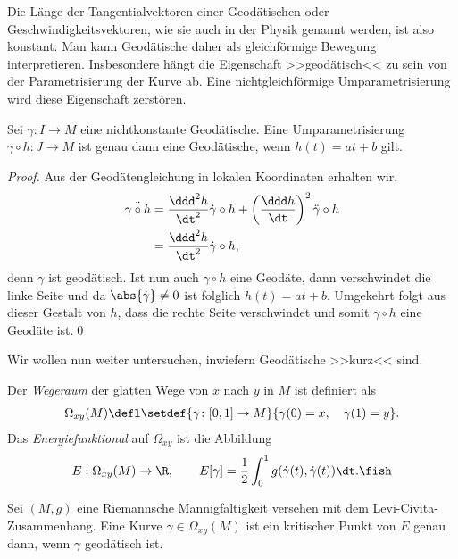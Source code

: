 \documentclass[%
	paper=a5,%
	fleqn,%
	DIV=18,%
	BCOR=0mm,
	fontsize=11pt,
	titlepage=false,%
	bibliography=totoc,
	DIV=18,%
	twoside=true,
	pdftitle=Riemannsche Geometrie,
	pdfauthor=Uwe Semmelmann,
	numbers=noendperiod]%
	{scrbook}
\begin{document}
Die Länge der Tangentialvektoren einer Geodätischen oder Geschwindigkeitsvektoren, wie sie auch in
der Physik genannt werden,  ist also konstant. Man kann Geodätische
daher als gleichförmige Bewegung interpretieren. Insbesondere hängt die
Eigenschaft >>geodätisch<< zu sein von der Parametrisierung der Kurve ab. Eine
nichtgleichförmige Umparametrisierung wird diese Eigenschaft zerstören.

\begin{lem}
Sei $\gamma\colon I\to M$ eine nichtkonstante Geodätische. Eine Umparametrisierung $\gamma\circ h \colon J\to M$ ist genau dann eine Geodätische, wenn $h(t) = at + b$ gilt.\fish
\end{lem}
\begin{proof}
Aus der Geodätengleichung in lokalen Koordinaten erhalten wir,
\begin{align*}
\ddot{\gamma\circ h} &= \frac{\ddd^2 h}{\dt^2} \dot{\gamma}\circ h + 
\left( \frac{\ddd h}{\dt}\right)^2 \ddot{\gamma}\circ h\\
&=\frac{\ddd^2 h}{\dt^2} \dot{\gamma}\circ h,
\end{align*}
denn $\gamma$ ist geodätisch. Ist nun auch $\gamma\circ h$ eine Geodäte, dann verschwindet die linke Seite und da $\abs{\dot\gamma}\neq 0$ ist folglich $h(t) = at+b$. Umgekehrt folgt aus dieser Gestalt von $h$, dass die rechte Seite verschwindet und somit $\gamma\circ h$ eine Geodäte ist.\qed
\end{proof}

Wir wollen nun weiter untersuchen, inwiefern Geodätische >>kurz<< sind.

\begin{defn}
Der \emph{Wegeraum} der glatten Wege von $x$ nach $y$ in $M$ ist definiert als
\begin{align*}
\Omega_{xy}(M) \defl \setdef{\gamma\colon[0,1]\to M}{\gamma(0)=x,\quad \gamma(1)=y}.
\end{align*} 
Das \emph{Energiefunktional} auf $\Omega_{xy}$ ist die Abbildung
\begin{align*}
E: \Omega_{xy}(M) \to \R,\qquad
E[\gamma] = \frac{1}{2} \int_0^1 g(\dot{\gamma}(t),\dot{\gamma}(t))\dt.\fish
\end{align*}
\end{defn}

\begin{prop}
Sei $(M,g)$ eine Riemannsche Mannigfaltigkeit versehen mit dem Levi-Civita-Zusammenhang.
Eine Kurve $\gamma\in \Omega_{xy}(M)$ ist ein kritischer Punkt von $E$ genau
dann, wenn $\gamma$ geodätisch ist.\fish
\end{prop}
\end{document}
